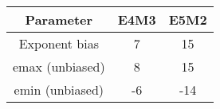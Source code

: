 \centering
\begin{tabular}{ccc}
Parameter       & E4M3 & E5M2 \\
\midrule
Exponent bias   & 7    & 15   \\
emax (unbiased) & 8    & 15   \\
emin (unbiased) & -6   & -14  \\
\end{tabular}
